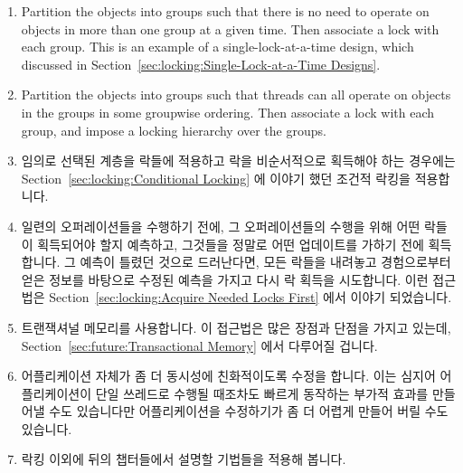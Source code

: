 {\begin{enumerate}
	\item	Partition the objects into groups such that there
		is no need to operate on objects in
		more than one group at a given time.
		Then associate a lock with each group.
		This is an example of a single-lock-at-a-time
		design, which discussed in
		Section~\ref{sec:locking:Single-Lock-at-a-Time Designs}.
	\item	Partition the objects into groups such that threads
		can all operate on objects in the groups in some
		groupwise ordering.
		Then associate a lock with each group, and impose a
		locking hierarchy over the groups.
	\fi
	\item	임의로 선택된 계층을 락들에 적용하고 락을 비순서적으로 획득해야
		하는 경우에는 
		Section~\ref{sec:locking:Conditional Locking} 에 이야기 했던
		조건적 락킹을 적용합니다.
	\item	일련의 오퍼레이션들을 수행하기 전에, 그 오퍼레이션들의 수행을
		위해 어떤 락들이 획득되어야 할지 예측하고, 그것들을 정말로 어떤
		업데이트를 가하기 전에 획득합니다.
		그 예측이 틀렸던 것으로 드러난다면, 모든 락들을 내려놓고
		경험으로부터 얻은 정보를 바탕으로 수정된 예측을 가지고 다시 락
		획득을 시도합니다.
		이런 접근법은
		Section~\ref{sec:locking:Acquire Needed Locks First} 에서
		이야기 되었습니다.

	\item	트랜잭셔널 메모리를 사용합니다.
		이 접근법은 많은 장점과 단점을 가지고 있는데,
		Section~\ref{sec:future:Transactional Memory} 에서 다루어질
		겁니다.
	\item	어플리케이션 자체가 좀 더 동시성에 친화적이도록 수정을 합니다.
		이는 심지어 어플리케이션이 단일 쓰레드로 수행될 때조차도 빠르게
		동작하는 부가적 효과를 만들어낼 수도 있습니다만 어플리케이션을
		수정하기가 좀 더 어렵게 만들어 버릴 수도 있습니다.
	\item	락킹 이외에 뒤의 챕터들에서 설명할 기법들을 적용해 봅니다.
	\iffalse


\end{enumerate}}
